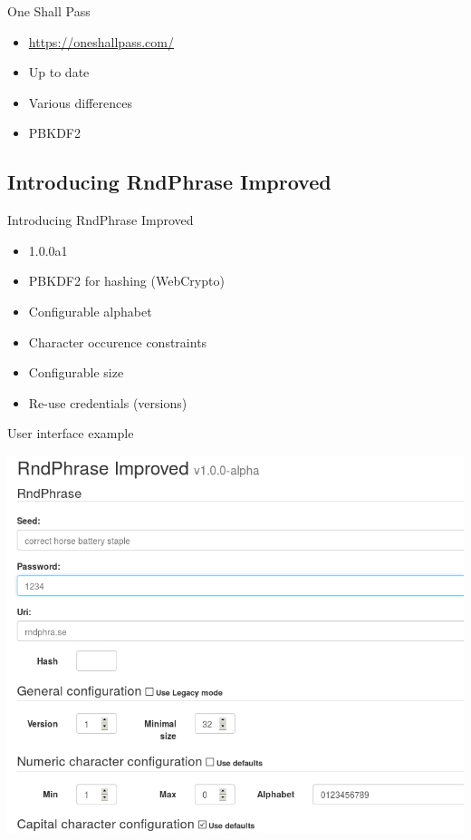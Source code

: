 \documentclass{beamer}
\begin{document}
\begin{frame}{One Shall Pass}
  \begin{itemize}
    \item \url{https://oneshallpass.com/}
    \item Up to date
    \item Various differences
    \item PBKDF2
  \end{itemize}
\end{frame}

\subsection{Introducing RndPhrase Improved}
\begin{frame}{Introducing RndPhrase Improved}
  \begin{itemize}
    \item 1.0.0a1
    \item PBKDF2 for hashing (WebCrypto)
    \item Configurable alphabet
    \item Character occurence constraints
    \item Configurable size
    \item Re-use credentials (versions)
  \end{itemize}
\end{frame}

\begin{frame}{User interface example}
  \begin{center}
    \includegraphics[scale=0.35]{rndphrase-screenshot.png}
  \end{center}
\end{frame}
\end{document}
